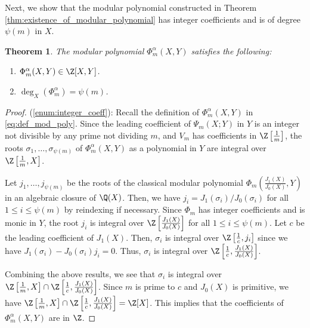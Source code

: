 \documentclass{amsart}
\newtheorem{theorem}{Theorem}[section]
\theoremstyle{definition}
\theoremstyle{remark}
\numberwithin{equation}{section}
\begin{document}
Next, we show that the modular polynomial constructed in Theorem \ref{thm:existence_of_modular_polynomial}
has integer coefficients and is of degree $\psi(m)$ in $X$.

\begin{theorem}\label{thm:integral_modular_polynomial}
    The modular polynomial $\Phi_m^{\alpha}(X, Y)$ satisfies the following:
    \begin{enumerate}
        \item $\Phi_m^{\alpha}(X, Y) \in \Z[X, Y]$. \label{enum:integer_coeff}
        \item $\deg_X(\Phi_m^{\alpha}) = \psi(m)$. \label{enum:degree_X}
    \end{enumerate}
\end{theorem}

\begin{proof}
    (\ref{enum:integer_coeff}):
    Recall the definition of $\Phi_m^{\alpha}(X, Y)$ in \eqref{eq:def_mod_poly}.
    Since the leading coefficient of $\Psi_m(X; Y)$ in $Y$ is an integer not divisible by any prime not dividing $m$,
    and $V_m$ has coefficients in $\Z\left[\frac{1}{m}\right]$,
    the roots $\sigma_1, \dots, \sigma_{\psi(m)}$ of $\Phi_m^{\alpha}(X, Y)$
    as a polynomial in $Y$
    are integral over $\Z\left[\frac{1}{m}, X\right]$.

    Let $j_1, \dots, j_{\psi(m)}$ be the roots of
    the classical modular polynomial $\Phi_m\left(\frac{J_1(X)}{J_0(X)}, Y\right)$
    in an algebraic closure of $\Q(X)$.
    Then, we have $j_i = J_1(\sigma_i)/J_0(\sigma_i)$ for all $1 \leq i \leq \psi(m)$
    by reindexing if necessary.
    Since $\Phi_m$ has integer coefficients and is monic in $Y$,
    the root $j_i$ is integral over $\Z\left[\frac{J_1(X)}{J_0(X)}\right]$ for all $1 \leq i \leq \psi(m)$.
    Let $c$ be the leading coefficient of $J_1(X)$.
    Then, $\sigma_i$ is integral over $\Z\left[\frac{1}{c}, j_i\right]$
    since we have $J_1(\sigma_i) - J_0(\sigma_i) j_i = 0$.
    Thus, 
    $\sigma_i$ is integral over $\Z\left[\frac{1}{c}, \frac{J_1(X)}{J_0(X)}\right]$.

    Combining the above results,
    we see that $\sigma_i$ is integral over $\Z\left[\frac{1}{m}, X\right] \cap \Z\left[\frac{1}{c}, \frac{J_1(X)}{J_0(X)}\right]$.
    Since $m$ is prime to $c$ and $J_0(X)$ is primitive,
    we have $\Z\left[\frac{1}{m}, X\right] \cap \Z\left[\frac{1}{c}, \frac{J_1(X)}{J_0(X)}\right] = \Z[X]$.
    This implies that the coefficients of $\Phi_m^{\alpha}(X, Y)$ are in $\Z$.


\end{proof}
\end{document}
